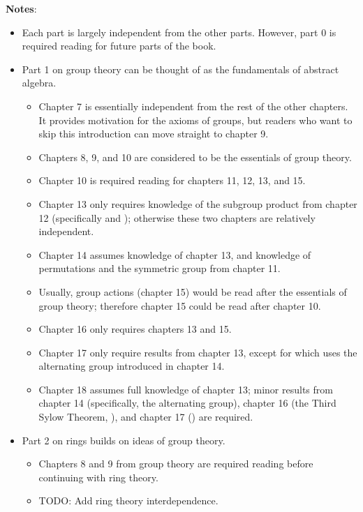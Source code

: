 \newpage
\begin{center}
\end{center}

\newpage

\textbf{Notes}:
\begin{itemize}
    \item Each part is largely independent from the other parts. However, part 0 is required reading for future parts of the book.
    \item Part 1 on group theory can be thought of as the fundamentals of abstract algebra.
    \begin{itemize}
        \item Chapter 7 is essentially independent from the rest of the other chapters. It provides motivation for the axioms of groups, but readers who want to skip this introduction can move straight to chapter 9.
        \item Chapters 8, 9, and 10 are considered to be the essentials of group theory.
        \item Chapter 10 is required reading for chapters 11, 12, 13, and 15.
        \item Chapter 13 only requires knowledge of the subgroup product from chapter 12 (specifically  and ); otherwise these two chapters are relatively independent.
        \item Chapter 14 assumes knowledge of chapter 13, and knowledge of permutations and the symmetric group from chapter 11.
        \item Usually, group actions (chapter 15) would be read after the essentials of group theory; therefore chapter 15 could be read after chapter 10.
        \item Chapter 16 only requires chapters 13 and 15.
        \item Chapter 17 only require results from chapter 13, except for  which uses the alternating group introduced in chapter 14.
        \item Chapter 18 assumes full knowledge of chapter 13; minor results from chapter 14 (specifically, the alternating group), chapter 16 (the Third Sylow Theorem, ), and chapter 17 () are required.
    \end{itemize}
    \item Part 2 on rings builds on ideas of group theory.
    \begin{itemize}
        \item Chapters 8 and 9 from group theory are required reading before continuing with ring theory.
        \item TODO: Add ring theory interdependence.
    \end{itemize}
\end{itemize}
